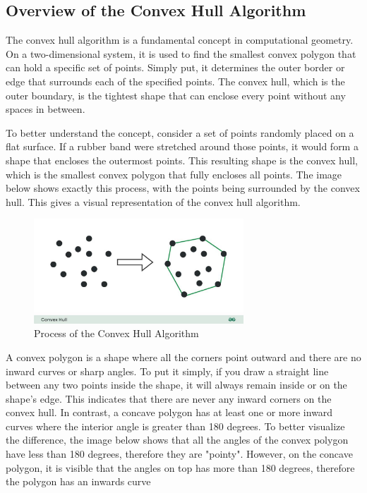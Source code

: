     \subsection{Overview of the Convex Hull Algorithm}
    The convex hull algorithm is a fundamental concept in computational geometry. On a two-dimensional system, it is used to find the smallest convex polygon that can hold a specific set of points. Simply put, it determines the outer border or edge that surrounds each of the specified points. The convex hull, which is the outer boundary, is the tightest shape that can enclose every point without any spaces in between. \newline
    
    To better understand the concept, consider a set of points randomly placed on a flat surface. If a rubber band were stretched around those points, it would form a shape that encloses the outermost points. This resulting shape is the convex hull, which is the smallest convex polygon that fully encloses all points. The image below shows exactly this process, with the points being surrounded by the convex hull. This gives a visual representation of the convex hull algorithm.
    \begin{figure} [H]
        \centering
        \includegraphics [width=0.7\textwidth] {images/andreas/areaBorders/convexHull.jpg}
        \caption{Process of the Convex Hull Algorithm \autocite{ProcessOfHull:Img}}
    \end{figure} 
    \blankLine 
    A convex polygon is a shape where all the corners point outward and there are no inward curves or sharp angles. To put it simply, if you draw a straight line between any two points inside the shape, it will always remain inside or on the shape's edge. This indicates that there are never any inward corners on the convex hull. In contrast, a concave polygon has at least one or more inward curves where the interior angle is greater than 180 degrees. \newline
    To better visualize the difference, the image below shows that all the angles of the convex polygon have less than 180 degrees, therefore they are "pointy". However, on the concave polygon, it is visible that the angles on top has more than 180 degrees, therefore the polygon has an inwards curve \autocite{Andi:convexPolygon}

